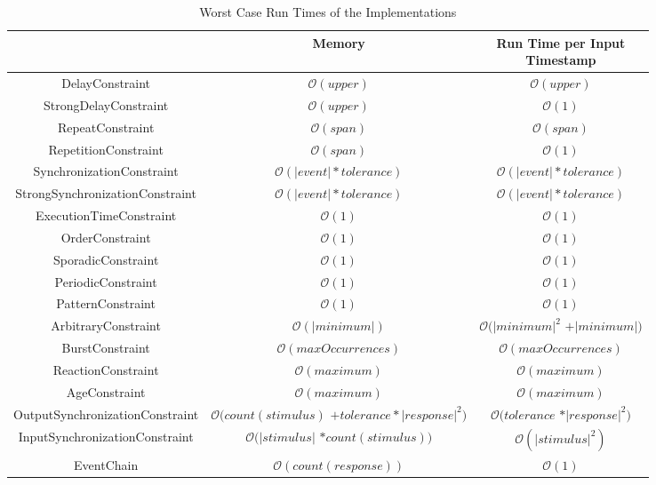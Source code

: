 	\begin{table}
		\begin{tabular}{|c|c|c|}
			\hline
			& Memory & \makecell{Run Time per Input\\Timestamp} \\
			\hline
			{DelayConstraint} & $\mathcal{O}(upper)$ & $\mathcal{O}(upper)$ \\
			\hline
			{StrongDelayConstraint} &  $\mathcal{O}(upper)$ &  $\mathcal{O}(1)$ \\
			\hline
			{RepeatConstraint} & $\mathcal{O}(span)$ & $\mathcal{O}(span)$ \\
			\hline
			{RepetitionConstraint} & $\mathcal{O}(span)$ & $\mathcal{O}(1)$ \\
			\hline
			SynchronizationConstraint & $\mathcal{O}(|event|*tolerance)$ & $\mathcal{O}(|event|*tolerance)$ \\
			\hline
			StrongSynchronizationConstraint & $\mathcal{O}(|event|*tolerance)$ & $\mathcal{O}(|event|*tolerance)$ \\
			\hline
			ExecutionTimeConstraint & $\mathcal{O}(1)$ & $\mathcal{O}(1)$ \\
			\hline
			OrderConstraint & $\mathcal{O}(1)$ & $\mathcal{O}(1)$ \\
			\hline
			SporadicConstraint & $\mathcal{O}(1)$ & $\mathcal{O}(1)$ \\
			\hline
			PeriodicConstraint & $\mathcal{O}(1)$ & $\mathcal{O}(1)$ \\
			\hline
			PatternConstraint & $\mathcal{O}(1)$ & $\mathcal{O}(1)$ \\
			\hline
			ArbitraryConstraint & $\mathcal{O}(|minimum|)$& \makecell{$\mathcal{O}(|minimum|^2$\\$+|minimum|)$} \\
			\hline
			BurstConstraint & $\mathcal{O}(maxOccurrences)$ & $\mathcal{O}(maxOccurrences)$ \\
			\hline
			ReactionConstraint & $\mathcal{O}(maximum)$ & $\mathcal{O}(maximum)$ \\
			\hline
			AgeConstraint & $\mathcal{O}(maximum)$ & $\mathcal{O}(maximum)$ \\
			\hline
			OutputSynchronizationConstraint& \makecell{$\mathcal{O}(count(stimulus)$\\$+tolerance*|response|^2)$} &  \makecell{$\mathcal{O}(tolerance$\\$*|response|^2)$}\\
			\hline
			InputSynchronizationConstraint& \makecell{$\mathcal{O}(|stimulus|$\\$*count(stimulus))$} & $\mathcal{O}(|stimulus|^2)$ \\
			\hline
			EventChain & $\mathcal{O}(count(response))$ & $\mathcal{O}(1)$\\
			\hline
		\end{tabular}
		\centering
		\label{tab:complexityClasses}
		\caption{Worst Case Run Times of the Implementations}
	\end{table}

	
	
